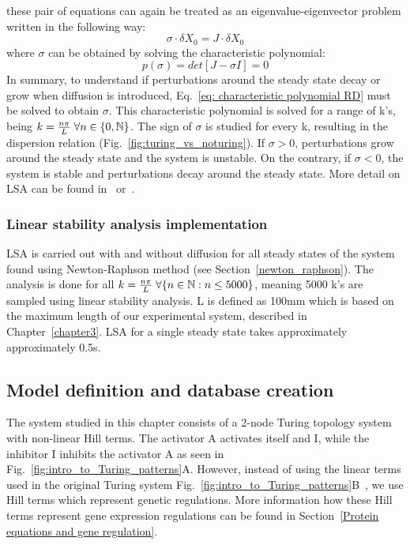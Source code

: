 these pair of equations can again be treated as an eigenvalue-eigenvector problem written in the following way:
\begin{equation}
    \sigma \cdot\delta X_{0} = J \cdot\delta X_{0}
    \label{eq: jacobian RD}
\end{equation}
where $\sigma$ can be obtained by solving the characteristic polynomial:
\begin{equation}
    p(\sigma) = det[J-\sigma I] = 0
    \label{eq: characteristic polynomial RD}
\end{equation}
In summary, to understand if perturbations around the steady state decay or grow when diffusion is introduced, Eq.~\ref{eq: characteristic polynomial RD} must be solved to obtain $\sigma$.
This characteristic polynomial is solved for a range of k's, being $k=\frac{n\pi}{L} \hspace{0.1cm}\forall n \in \{0, \mathbb{N}\} $.
The sign of $\sigma$ is studied for every k, resulting in the dispersion relation (Fig.~\ref{fig:turing_vs_noturing}).
If $\sigma > 0$, perturbations grow around the steady state and the system is unstable.
On the contrary, if  $\sigma < 0$, the system is stable and perturbations decay around the steady state.
More detail on LSA can be found in~\cite{J.DMurray2002} or~\cite{Glendinning1994}.

\subsubsection{Linear stability analysis implementation}
LSA is carried out with and without diffusion for all steady states of the system found using Newton-Raphson method (see Section~\ref{newton_raphson}).
The analysis is done for all $k=\frac{n\pi}{L} \hspace{0.1cm}\forall \{n \in \mathbb{N} : n \leq 5000\} $, meaning 5000 k's are sampled using linear stability analysis.
L is defined as 100mm which is based on the maximum length of our experimental system, described in Chapter~\ref{chapter3}.
LSA for a single steady state takes approximately approximately 0.5s.

\subsection{Model definition and database creation}
The system studied in this chapter consists of a 2-node Turing topology system with non-linear Hill terms.
The activator A activates itself and I, while the inhibitor I inhibits the activator A as seen in Fig.~\ref{fig:intro_to_Turing_patterns}A.
However, instead of using the linear terms used in the original Turing system Fig.~\ref{fig:intro_to_Turing_patterns}B~\parencite{Turing1952}, we use Hill terms which represent genetic regulations.
More information how these Hill terms represent gene expression regulations can be found in Section~\ref{Protein equations and gene regulation}.

